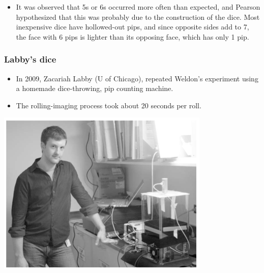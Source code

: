 \begin{frame}
\begin{itemize}
\item It was observed that 5s or 6s occurred more often than expected, and Pearson hypothesized that this was probably due to the construction of the dice. Most inexpensive dice have hollowed-out pips, and since opposite sides add to 7, the face with 6 pips is lighter than its opposing face, which has only 1 pip.

\end{itemize}

\end{frame}


\begin{frame}
\frametitle{Labby's dice}

{
\begin{itemize}

\item In 2009, Zacariah Labby (U of Chicago), repeated Weldon's experiment using a homemade dice-throwing, pip counting machine.
\begin{center}
\end{center}

\item The rolling-imaging process took about 20 seconds per roll.

\end{itemize}
}
{
\begin{center}
\includegraphics[width=\textwidth]{6-3_chisq_gof/figures/dice/labby}
\end{center}
}


\end{frame}
